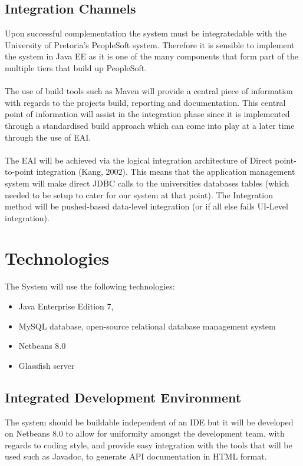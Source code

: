 \documentclass[12pt]{article}
\begin{document}
\subsection{Integration Channels}
Upon successful complementation the system must be integratedable with the University of Pretoria's PeopleSoft system. Therefore it is sensible to implement the system in Java EE as it is one of the many components that form part of the multiple tiers that build up  PeopleSoft. \\
\\
The use of build tools such as Maven will provide a central piece of information with regards to the projects build, reporting and documentation. This central point of information will assist in the integration phase since it is implemented through a standardised build approach which can come into play at a later time through the use of EAI.\\
\\
The EAI will be achieved via  the logical integration architecture of Direct point-to-point integration (Kang, 2002). This means that the application management system will make direct JDBC calls to the universities databases tables (which needed to be setup to cater for our system at that point). The Integration method will be pushed-based data-level integration (or if all else fails UI-Level integration).

\section{Technologies}
The System will use the following technologies:
\begin{itemize}
\item Java Enterprise Edition 7, 
\item MySQL database, open-source relational database management system
\item Netbeans 8.0
\item Glassfish server
\end{itemize}

\subsection*{Integrated Development Environment}
The system should be buildable independent of an IDE but it will be developed on Netbeans 8.0 to allow for uniformity amongst the development team, with regards to coding style, and provide easy integration with the tools that will be used such as Javadoc, to generate  API documentation in HTML format.
\end{document}
